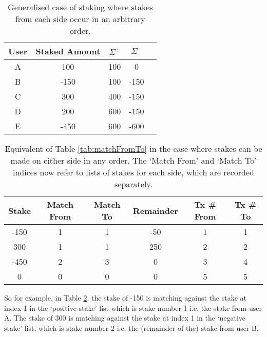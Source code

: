 \begin{table}[ht]
\centering
\caption{Generalised case of staking where stakes from each side occur in an arbitrary order.}
\label{appa:modifiedexample}
\begin{tabular}{|c|c|c|c|c|}
\hline
User  & Staked Amount & $\Sigma^+$ & $\Sigma^-$ \\ \hline
A & 100           & 100                      & 0                                                                       \\ \hline
B & -150           & 100                      & -150                                                                     \\ \hline
C & 300           & 400                      & -150                                                                       \\ \hline
D & 200          & 600                      & -150                                                                    \\ \hline
E & -450          & 600                      & -600                                                                    \\ \hline
\end{tabular}
\end{table}

\begin{table}[ht]
\centering
\caption{Equivalent of Table \ref{tab:matchFromTo} in the case where stakes can be made on either side in any order. The `Match From' and `Match To' indices now refer to lists of stakes for each side, which are recorded separately.}
\label{appa:modifiedexamplelog}
\begin{tabular}{|c|c|c|c|c|c|}
\hline
Stake & Match From & Match To & Remainder & Tx \# From & Tx \# To\\ \hline
-150  & 1          & 1        & -50      & 1 & 1 \\ \hline
300   & 1          & 1        & 250      & 2 & 2 \\ \hline
-450  & 2          & 3        & 0       &  3 & 4 \\ \hline
0  & 0         & 0        & 0 & 5 & 5            \\ \hline
\end{tabular}

\end{table}

So for example, in Table \ref{appa:modifiedexamplelog}, the stake of -150 is matching against the stake at index 1 in the `positive stake' list which is stake number 1 i.e. the stake from user A. The stake of 300 is matching against the stake at index 1 in the `negative stake' list, which is stake number 2 i.e. the (remainder of the) stake from user B.